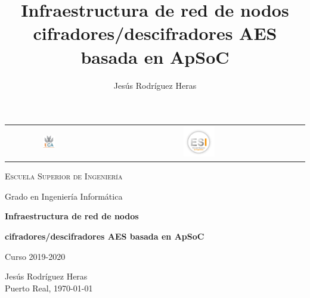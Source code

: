 \documentclass{book}
\title{\huge{Infraestructura de red de nodos cifradores/descifradores AES basada en ApSoC}}
\author{Jesús Rodríguez Heras}
\newenvironment{changemargin}[2]{%
	\begin{list}{}{%
			\setlength{\topsep}{0pt}%
			\setlength{\leftmargin}{#1}%
			\setlength{\rightmargin}{#2}%
			\setlength{\listparindent}{\parindent}%
			\setlength{\itemindent}{\parindent}%
			\setlength{\parsep}{\parskip}%
		}%
		\item[]}{\end{list}}
\begin{document}
\begin{titlepage}
	\centering

\begin{table}[htb]
				\centering
				\begin{tabular}{cc}
					\includegraphics[width=0.15\textwidth]{UCA.png}\par\vspace{0.2cm} & \includegraphics[width=0.15\textwidth]{ESI.png}\par\vspace{0.2cm}
				\end{tabular}
			\end{table}
	
	
	\begin{changemargin}{3em}{3em}
		\centering
		
		{\LARGE \textsc{\nohyphens{Escuela Superior de Ingeniería}}}
		
		\bigskip
		\bigskip
		\bigskip
		\bigskip
		
		{\LARGE \nohyphens{Grado en Ingeniería Informática}}
		
		\bigskip
		\bigskip
		\bigskip
		\bigskip
		\bigskip
		
		{\LARGE \nohyphens{\textbf{Infraestructura de red de nodos}}}
		
		{\LARGE \nohyphens{\textbf{cifradores/descifradores AES basada en ApSoC}}}
		
		\bigskip
		\bigskip
		\bigskip
		\bigskip
		
		{\large Curso 2019-2020}
		
		\bigskip
		\bigskip
		\bigskip
		\bigskip
		
	\end{changemargin}
	
	{\Large Jesús Rodríguez Heras} \\
	\bigskip
	\bigskip 
	\bigskip 
	{\large Puerto Real, \today}
	
\end{titlepage}
\end{document}
